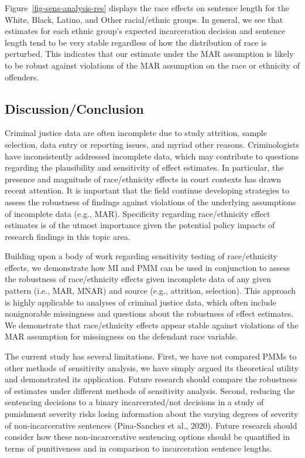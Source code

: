 \documentclass[
  letterpaper,
  DIV=11,
  numbers=noendperiod]{scrartcl}
\begin{document}
Figure~\ref{fig-sens-analysis-res} displays the race effects on sentence
length for the White, Black, Latino, and Other racial/ethnic groups. In
general, we see that estimates for each ethnic group's expected
incarceration decision and sentence length tend to be very stable
regardless of how the distribution of race is perturbed. This indicates
that our estimate under the MAR assumption is likely to be robust
against violations of the MAR assumption on the race or ethnicity of
offenders.

\hypertarget{discussionconclusion}{%
\subsection{Discussion/Conclusion}\label{discussionconclusion}}

Criminal justice data are often incomplete due to study attrition,
sample selection, data entry or reporting issues, and myriad other
reasons. Criminologists have inconsistently addressed incomplete data,
which may contribute to questions regarding the plausibility and
sensitivity of effect estimates. In particular, the presence and
magnitude of race/ethnicity effects in court contexts has drawn recent
attention. It is important that the field continue developing strategies
to assess the robustness of findings against violations of the
underlying assumptions of incomplete data (e.g., MAR). Specificity
regarding race/ethnicity effect estimates is of the utmost importance
given the potential policy impacts of research findings in this topic
area.

Building upon a body of work regarding sensitivity testing of
race/ethnicity effects, we demonstrate how MI and PMM can be used in
conjunction to assess the robustness of race/ethnicity effects given
incomplete data of any given pattern (i.e., MAR, MNAR) and source (e.g.,
attrition, selection). This approach is highly applicable to analyses of
criminal justice data, which often include nonignorable missingness and
questions about the robustness of effect estimates. We demonstrate that
race/ethnicity effects appear stable against violations of the MAR
assumption for missingness on the defendant race variable.

The current study has several limitations. First, we have not compared
PMMs to other methods of sensitivity analysis, we have simply argued its
theoretical utility and demonstrated its application. Future research
should compare the robustness of estimates under different methods of
sensitivity analysis. Second, reducing the sentencing decisions to a
binary incarcerated/not decisions in a study of punishment severity
risks losing information about the varying degrees of severity of
non-incarcerative sentences (Pina-Sanchez et al., 2020). Future research
should consider how these non-incarcerative sentencing options should be
quantified in terms of punitiveness and in comparison to incarceration
sentence lengths.
\end{document}
